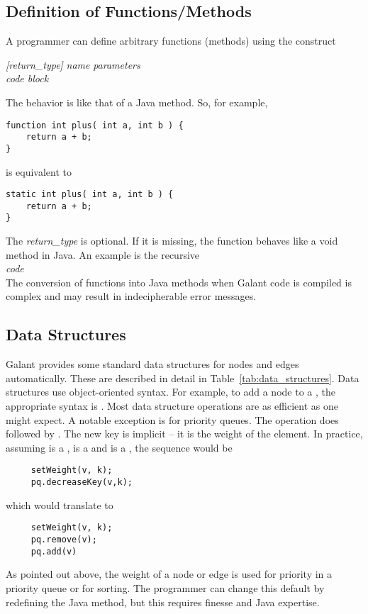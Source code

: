 \subsection{Definition of Functions/Methods}\label{sec:functions}

A programmer can define arbitrary functions (methods) using the construct

 \textsl{[return\_type]} \textsl{name} \Code{(}
 \textsl{parameters} \Code{) \{} \\
 \hspace*{3em} \emph{code block} \\
 \Code{\}}

The behavior is like that of a Java method. So, for example,
\begin{verbatim}
function int plus( int a, int b ) {
    return a + b;
}
\end{verbatim}
is equivalent to
\begin{verbatim}
static int plus( int a, int b ) {
    return a + b;
}
\end{verbatim}

The \textsl{return\_type} is optional. If it is missing, the function behaves like
a \textsf{void} method in Java. An example is the recursive
\\
 \textsl{code} \Code{\}}
\\
The conversion of functions into Java methods when Galant code is compiled
is complex and may result in indecipherable error messages.



\subsection{Data Structures}

Galant provides some standard data structures for nodes and edges automatically.
These are described in detail in Table~\ref{tab:data_structures}.
Data structures use object-oriented syntax.
For example, to add a node  to a  ,
the appropriate syntax is .
Most data structure operations are as efficient as one might expect.
A notable exception is 
for priority queues.
The operation 
does  followed by .
The new key is implicit -- it is the weight of the element.
In practice, assuming  is a ,
 is a 
and  is a , the sequence would be
\begin{verbatim}
     setWeight(v, k);
     pq.decreaseKey(v,k);
\end{verbatim}
which would translate to
\begin{verbatim}
     setWeight(v, k);
     pq.remove(v);
     pq.add(v)
\end{verbatim}
As pointed out above, the weight of a node or edge is used for priority in a priority
queue or for sorting.
The programmer can change this default
by redefining the Java  method,
but this requires finesse and Java expertise.

